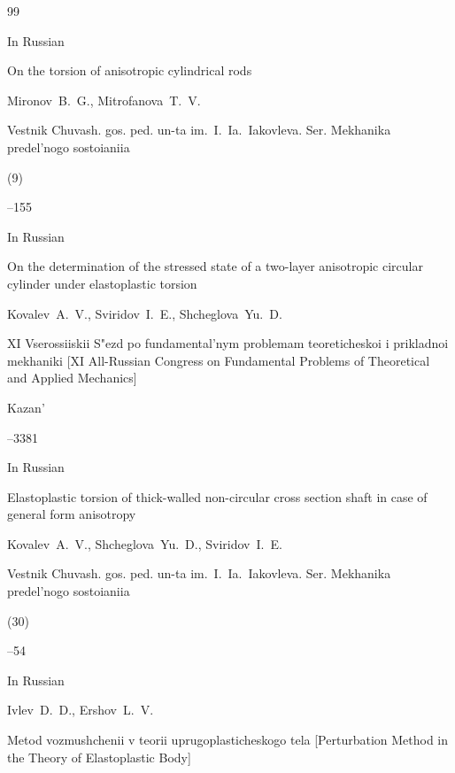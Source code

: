 \begin{thebibliography}{99}

\lang In Russian

\paper On the torsion  of anisotropic cylindrical rods

\by Mironov~B.~G., Mitrofanova~T.~V.

\jour Vestnik Chuvash. gos. ped. un-ta im.~I.~Ia.~Iakovleva. Ser. Mekhanika predel'nogo sostoianiia


(9)

--155






\lang In Russian

\paper On the determination of the stressed state of a two-layer anisotropic circular cylinder under elastoplastic torsion

\by Kovalev~A.~V., Sviridov~I.~E., Shcheglova~Yu.~D.

\inbook XI Vserossiiskii S"ezd po fundamental'nym problemam teoreticheskoi i prikladnoi mekhaniki \rm [XI All-Russian Congress on Fundamental Problems of Theoretical and Applied Mechanics]

\publaddr Kazan'


--3381






\lang In Russian

\paper Elastoplastic torsion of thick-walled non-circular cross section shaft in case of general form anisotropy

\by Kovalev~A.~V., Shcheglova~Yu.~D., Sviridov~I.~E.

\jour Vestnik Chuvash. gos. ped. un-ta im.~I.~Ia.~Iakovleva. Ser. Mekhanika predel'nogo sostoianiia


(30)

--54






\lang In Russian

\by Ivlev~D.~D., Ershov~L.~V.

\book Metod vozmushchenii v teorii uprugoplasticheskogo tela \rm [Perturbation Method in the Theory of Elastoplastic Body]


\end{thebibliography}
